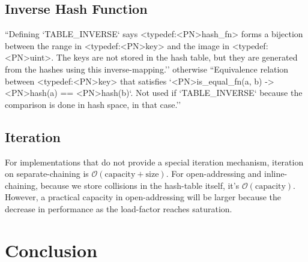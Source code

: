 \documentclass[12pt]{article}
\begin{document}
\subsection{Inverse Hash Function}

``Defining `TABLE\_INVERSE` says <typedef:<PN>hash\_fn> forms a bijection
 between the range in <typedef:<PN>key> and the image in <typedef:<PN>uint>.
 The keys are not stored in the hash table, but they are generated from the
 hashes using this inverse-mapping.'' otherwise ``Equivalence relation between <typedef:<PN>key> that satisfies
 `<PN>is\_equal\_fn(a, b) -> <PN>hash(a) == <PN>hash(b)`. Not used if
 `TABLE\_INVERSE` because the comparison is done in hash space, in that case.''

\subsection{Iteration}

For implementations that do not provide a special iteration mechanism, iteration on separate-chaining is $\mathcal{O}(\text{capacity} + \text{size})$. For open-addressing and inline-chaining, because we store collisions in the hash-table itself, it's $\mathcal{O}(\text{capacity})$. However, a practical capacity in open-addressing will be larger because the decrease in performance as the load-factor reaches saturation.

\section{Conclusion}


\end{document}

